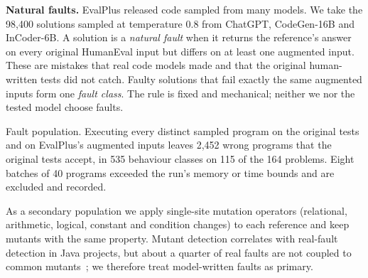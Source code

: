 \documentclass[11pt]{article}
\begin{document}
\textbf{Natural faults.} EvalPlus released code sampled from many models. We take
the 98{,}400 solutions sampled at temperature 0.8 from ChatGPT, CodeGen-16B and
InCoder-6B. A solution is a \emph{natural fault} when it returns the reference's
answer on every original HumanEval input but differs on at least one augmented
input. These are mistakes that real code models made and that the original
human-written tests did not catch. Faulty solutions that fail exactly the same
augmented inputs form one \emph{fault class}. The rule is fixed and mechanical;
neither we nor the tested model choose faults.

\begin{center}

{\footnotesize Fault population. Executing every distinct sampled program on
the original tests and on EvalPlus's augmented inputs leaves 2{,}452 wrong
programs that the original tests accept, in 535 behaviour classes on 115 of
the 164 problems. Eight batches of 40 programs exceeded the run's memory or
time bounds and are excluded and recorded.}
\end{center}

As a secondary population we apply single-site mutation operators (relational,
arithmetic, logical, constant and condition changes) to each reference and keep
mutants with the same property. Mutant detection correlates with real-fault
detection in Java projects, but about a quarter of real faults are not coupled to
common mutants~\cite[\S3]{mutants}; we therefore treat model-written faults as
primary.
\end{document}
